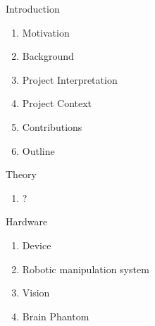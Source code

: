 Introduction
\begin{enumerate}
    \item Motivation
    \item Background
    \item Project Interpretation
    \item Project Context
    \item Contributions
    \item Outline
\end{enumerate}

Theory
\begin{enumerate}
    \item ?
\end{enumerate}

Hardware
\begin{enumerate}
    \item Device
    \item Robotic manipulation system
    \item Vision
    \item Brain Phantom
\end{enumerate}

